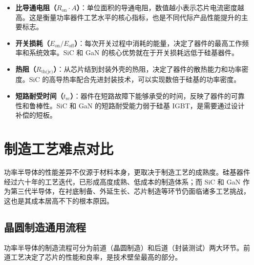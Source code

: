 \begin{itemize}[leftmargin=2em]
\item \textbf{比导通电阻（$R_{\text{on}} \cdot A$）}：单位面积的导通电阻，数值越小表示芯片电流密度越高。这是衡量功率器件工艺水平的核心指标，也是不同代际产品性能提升的主要标志。
\item \textbf{开关损耗（$E_{\text{on}} / E_{\text{off}}$）}：每次开关过程中消耗的能量，决定了器件的最高工作频率和系统效率。SiC 和 GaN 的核心优势就在于开关损耗远低于硅基器件。
\item \textbf{热阻（$R_{\text{th(jc)}}$）}：从芯片结到封装外壳的热阻，决定了器件的散热能力和功率密度。SiC 的高导热率配合先进封装技术，可以实现数倍于硅基的功率密度。
\item \textbf{短路耐受时间（$t_{\text{sc}}$）}：器件在短路故障下能够承受的时间，反映了器件的可靠性和鲁棒性。SiC 和 GaN 的短路耐受能力弱于硅基 IGBT，是需要通过设计补偿的短板。
\end{itemize}

\section{制造工艺难点对比}

功率半导体的性能差异不仅源于材料本身，更取决于制造工艺的成熟度。硅基器件经过六十年的工艺迭代，已形成高度成熟、低成本的制造体系；而 SiC 和 GaN 作为第三代半导体，在衬底制备、外延生长、芯片制造等环节仍面临诸多工艺挑战，这也是其成本居高不下的根本原因。

\subsection{晶圆制造通用流程}

功率半导体的制造流程可分为前道（晶圆制造）和后道（封装测试）两大环节。前道工艺决定了芯片的性能和良率，是技术壁垒最高的部分。

